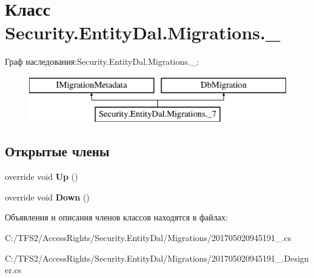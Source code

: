 \hypertarget{class_security_1_1_entity_dal_1_1_migrations_1_1__7}{}\section{Класс Security.\+Entity\+Dal.\+Migrations.\+\_}
\label{class_security_1_1_entity_dal_1_1_migrations_1_1__7}
Граф наследования\+:Security.\+Entity\+Dal.\+Migrations.\+\_\+:\begin{figure}[H]
\begin{center}
\leavevmode
\includegraphics[height=2.000000cm]{d3/d48/class_security_1_1_entity_dal_1_1_migrations_1_1__7}
\end{center}
\end{figure}
\subsection*{Открытые члены}
\begin{DoxyCompactItemize}
\item 
\mbox{\label{class_security_1_1_entity_dal_1_1_migrations_1_1__7_a6b5b7ed99af408c8ba179320dbb5f6d0}} 
override void {\bfseries Up} ()
\item 
\mbox{\label{class_security_1_1_entity_dal_1_1_migrations_1_1__7_a32e3d469b358b3fc84a2aa7e601e4923}} 
override void {\bfseries Down} ()
\end{DoxyCompactItemize}


Объявления и описания членов классов находятся в файлах\+:\begin{DoxyCompactItemize}
\item 
C\+:/\+T\+F\+S2/\+Access\+Rights/\+Security.\+Entity\+Dal/\+Migrations/201705020945191\+\_.\+cs\item 
C\+:/\+T\+F\+S2/\+Access\+Rights/\+Security.\+Entity\+Dal/\+Migrations/201705020945191\+\_.\+Designer.\+cs\end{DoxyCompactItemize}
